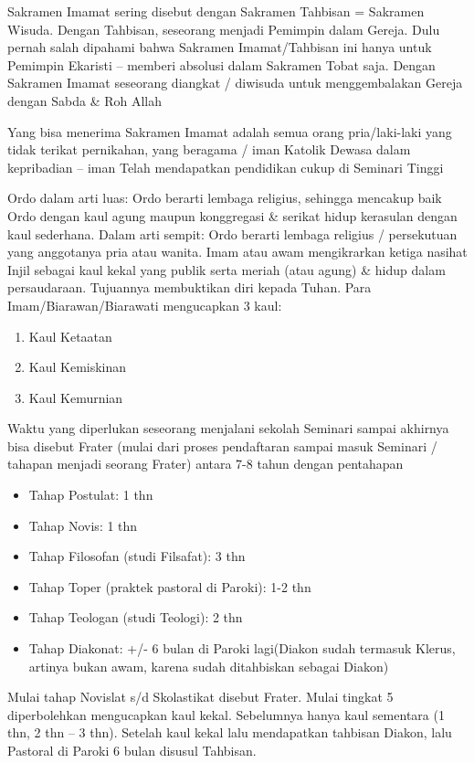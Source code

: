 Sakramen Imamat sering disebut dengan Sakramen Tahbisan = Sakramen Wisuda. Dengan Tahbisan, seseorang menjadi Pemimpin dalam Gereja. Dulu pernah salah dipahami bahwa Sakramen Imamat/Tahbisan ini hanya untuk Pemimpin Ekaristi – memberi absolusi dalam Sakramen Tobat saja. Dengan Sakramen Imamat seseorang diangkat / diwisuda untuk menggembalakan Gereja dengan Sabda \& Roh Allah

Yang bisa menerima Sakramen Imamat adalah
semua orang pria/laki-laki yang tidak terikat pernikahan, yang beragama / iman Katolik
    Dewasa dalam kepribadian -- iman
    Telah mendapatkan pendidikan cukup di Seminari Tinggi

Ordo dalam arti luas: Ordo berarti lembaga religius, sehingga mencakup baik Ordo dengan kaul agung maupun konggregasi \& serikat hidup kerasulan dengan kaul sederhana. Dalam arti sempit: Ordo berarti lembaga religius / persekutuan yang anggotanya pria atau wanita. Imam atau awam mengikrarkan ketiga nasihat Injil sebagai kaul kekal yang publik serta meriah (atau agung) \& hidup dalam persaudaraan. Tujuannya membuktikan diri kepada Tuhan. Para Imam/Biarawan/Biarawati mengucapkan 3 kaul:
\begin{enumerate}
\item Kaul Ketaatan
\item Kaul Kemiskinan
\item Kaul Kemurnian
\end{enumerate}

Waktu yang diperlukan seseorang menjalani sekolah Seminari sampai akhirnya bisa disebut Frater (mulai dari proses pendaftaran sampai masuk Seminari / tahapan menjadi seorang Frater)
antara 7-8 tahun dengan pentahapan

\begin{itemize}
\item Tahap Postulat: 1 thn
\item Tahap Novis: 1 thn
\item Tahap Filosofan (studi Filsafat): 3 thn
\item Tahap Toper (praktek pastoral di Paroki): 1-2 thn
\item Tahap Teologan (studi Teologi): 2 thn
\item Tahap Diakonat: +/- 6 bulan di Paroki lagi(Diakon sudah termasuk Klerus, artinya bukan awam, karena sudah ditahbiskan sebagai Diakon)
\end{itemize}

Mulai tahap Novislat s/d Skolastikat disebut Frater. Mulai tingkat 5 diperbolehkan mengucapkan kaul kekal. Sebelumnya hanya kaul sementara (1 thn, 2 thn – 3 thn). Setelah kaul kekal lalu mendapatkan tahbisan Diakon, lalu Pastoral di Paroki 6 bulan disusul Tahbisan.

